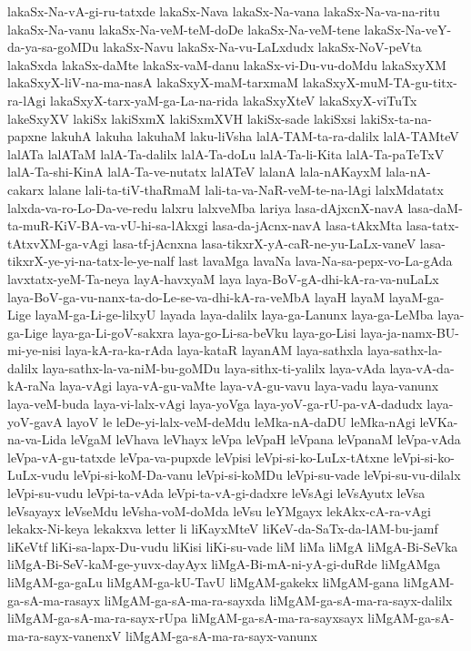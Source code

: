 {lakaSx-Na-vA-gi-ru-tatxde
lakaSx-Nava
lakaSx-Na-vana
lakaSx-Na-va-na-ritu
lakaSx-Na-vanu
lakaSx-Na-veM-teM-doDe
lakaSx-Na-veM-tene
lakaSx-Na-veY-da-ya-sa-goMDu
lakaSx-Navu
lakaSx-Na-vu-LaLxdudx
lakaSx-NoV-peVta
lakaSxda
lakaSx-daMte
lakaSx-vaM-danu
lakaSx-vi-Du-vu-doMdu
lakaSxyXM
lakaSxyX-liV-na-ma-nasA
lakaSxyX-maM-tarxmaM
lakaSxyX-muM-TA-gu-titx-ra-lAgi
lakaSxyX-tarx-yaM-ga-La-na-rida
lakaSxyXteV
lakaSxyX-viTuTx
lakeSxyXV
lakiSx
lakiSxmX
lakiSxmXVH
lakiSx-sade
lakiSxsi
lakiSx-ta-na-papxne
lakuhA
lakuha
lakuhaM
laku-liVsha
lalA-TAM-ta-ra-dalilx
lalA-TAMteV
lalATa
lalATaM
lalA-Ta-dalilx
lalA-Ta-doLu
lalA-Ta-li-Kita
lalA-Ta-paTeTxV
lalA-Ta-shi-KinA
lalA-Ta-ve-nutatx
lalATeV
lalanA
lala-nAKayxM
lala-nA-cakarx
lalane
lali-ta-tiV-thaRmaM
lali-ta-va-NaR-veM-te-na-lAgi
lalxMdatatx
lalxda-va-ro-Lo-Da-ve-redu
lalxru
lalxveMba
lariya
lasa-dAjxcnX-navA
lasa-daM-ta-muR-KiV-BA-va-vU-hi-sa-lAkxgi
lasa-da-jAcnx-navA
lasa-tAkxMta
lasa-tatx-tAtxvXM-ga-vAgi
lasa-tf-jAcnxna
lasa-tikxrX-yA-caR-ne-yu-LaLx-vaneV
lasa-tikxrX-ye-yi-na-tatx-le-ye-nalf
last
lavaMga
lavaNa
lava-Na-sa-pepx-vo-La-gAda
lavxtatx-yeM-Ta-neya
layA-havxyaM
laya
laya-BoV-gA-dhi-kA-ra-va-nuLaLx
laya-BoV-ga-vu-nanx-ta-do-Le-se-va-dhi-kA-ra-veMbA
layaH
layaM
layaM-ga-Lige
layaM-ga-Li-ge-lilxyU
layada
laya-dalilx
laya-ga-Lanunx
laya-ga-LeMba
laya-ga-Lige
laya-ga-Li-goV-sakxra
laya-go-Li-sa-beVku
laya-go-Lisi
laya-ja-namx-BU-mi-ye-nisi
laya-kA-ra-ka-rAda
laya-kataR
layanAM
laya-sathxla
laya-sathx-la-dalilx
laya-sathx-la-va-niM-bu-goMDu
laya-sithx-ti-yalilx
laya-vAda
laya-vA-da-kA-raNa
laya-vAgi
laya-vA-gu-vaMte
laya-vA-gu-vavu
laya-vadu
laya-vanunx
laya-veM-buda
laya-vi-lalx-vAgi
laya-yoVga
laya-yoV-ga-rU-pa-vA-dadudx
laya-yoV-gavA
layoV
le
leDe-yi-lalx-veM-deMdu
leMka-nA-daDU
leMka-nAgi
leVKa-na-va-Lida
leVgaM
leVhava
leVhayx
leVpa
leVpaH
leVpana
leVpanaM
leVpa-vAda
leVpa-vA-gu-tatxde
leVpa-va-pupxde
leVpisi
leVpi-si-ko-LuLx-tAtxne
leVpi-si-ko-LuLx-vudu
leVpi-si-koM-Da-vanu
leVpi-si-koMDu
leVpi-su-vade
leVpi-su-vu-dilalx
leVpi-su-vudu
leVpi-ta-vAda
leVpi-ta-vA-gi-dadxre
leVsAgi
leVsAyutx
leVsa
leVsayayx
leVseMdu
leVsha-voM-doMda
leVsu
leYMgayx
lekAkx-cA-ra-vAgi
lekakx-Ni-keya
lekakxva
letter
li
liKayxMteV
liKeV-da-SaTx-da-lAM-bu-jamf
liKeVtf
liKi-sa-lapx-Du-vudu
liKisi
liKi-su-vade
liM
liMa
liMgA
liMgA-Bi-SeVka
liMgA-Bi-SeV-kaM-ge-yuvx-dayAyx
liMgA-Bi-mA-ni-yA-gi-duRde
liMgAMga
liMgAM-ga-gaLu
liMgAM-ga-kU-TavU
liMgAM-gakekx
liMgAM-gana
liMgAM-ga-sA-ma-rasayx
liMgAM-ga-sA-ma-ra-sayxda
liMgAM-ga-sA-ma-ra-sayx-dalilx
liMgAM-ga-sA-ma-ra-sayx-rUpa
liMgAM-ga-sA-ma-ra-sayxsayx
liMgAM-ga-sA-ma-ra-sayx-vanenxV
liMgAM-ga-sA-ma-ra-sayx-vanunx
}
